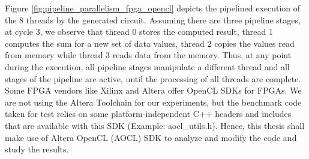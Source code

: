 Figure \ref{fig:pipeline_parallelism_fpga_opencl} depicts the pipelined execution of the 8 threads by the generated circuit. Assuming there are three pipeline stages, at cycle 3, we observe that thread 0 stores the computed result, thread 1 computes the sum for a new set of data values, thread 2 copies the values read from memory while thread 3 reads data from the memory. Thus, at any point during the execution, all pipeline stages manipulate a different thread and all stages of the pipeline are active, until the processing of all threads are complete. \newline \newline
Some FPGA vendors like Xilinx and Altera offer OpenCL SDKs for FPGAs. We are not using the Altera Toolchain for our experiments, but the benchmark code taken for test relies on some platform-independent C++ headers and includes that are available with this SDK (Example: aocl\_utils.h). Hence, this thesis shall make use of Altera OpenCL (AOCL) SDK to analyze and modify the code and study the results.
